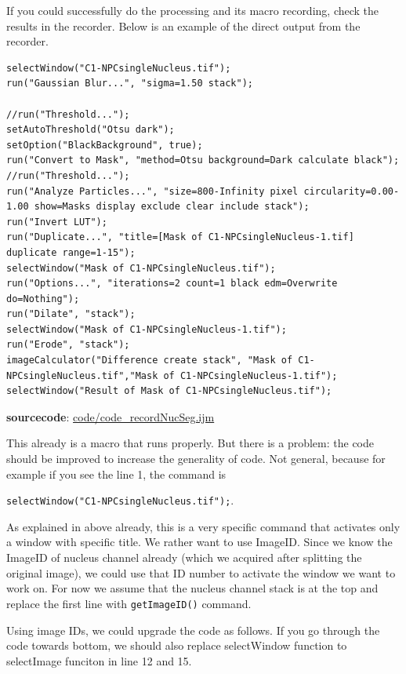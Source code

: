 \documentclass[11pt,a4paper,oneside]{report}
\newcommand{\ilcom}[1]{\texttt{\small#1}}
\begin{document}
If you could successfully do the processing and its macro recording, check the results in the recorder. Below is an example of the direct output from the recorder. 


\begin{lstlisting}
selectWindow("C1-NPCsingleNucleus.tif");
run("Gaussian Blur...", "sigma=1.50 stack");

//run("Threshold...");
setAutoThreshold("Otsu dark");
setOption("BlackBackground", true);
run("Convert to Mask", "method=Otsu background=Dark calculate black");
//run("Threshold...");
run("Analyze Particles...", "size=800-Infinity pixel circularity=0.00-1.00 show=Masks display exclude clear include stack");
run("Invert LUT");
run("Duplicate...", "title=[Mask of C1-NPCsingleNucleus-1.tif] duplicate range=1-15");
selectWindow("Mask of C1-NPCsingleNucleus.tif");
run("Options...", "iterations=2 count=1 black edm=Overwrite do=Nothing");
run("Dilate", "stack");
selectWindow("Mask of C1-NPCsingleNucleus-1.tif");
run("Erode", "stack");
imageCalculator("Difference create stack", "Mask of C1-NPCsingleNucleus.tif","Mask of C1-NPCsingleNucleus-1.tif");
selectWindow("Result of Mask of C1-NPCsingleNucleus.tif");

\end{lstlisting}
\textbf{sourcecode}: \href{http://www.example.com/contents}{code/code\_recordNucSeg.ijm}

This already is a macro that runs properly. But there is a problem: the code should be improved to increase the generality of code. Not general, because for example if you see the line 1, the command is 

\ilcom{selectWindow("C1-NPCsingleNucleus.tif");}. 


As explained in above already, this is a very specific command that activates only a window with specific title. We rather want to use ImageID. Since we know the ImageID of nucleus channel already (which we acquired after splitting the original image), we could use that ID number to activate the window we want to work on. For now we assume that the nucleus channel stack is at the top and replace the first line with \ilcom{getImageID()} command. 

Using image IDs, we could upgrade the code as follows.  If you go through the code towards bottom, we should also replace selectWindow function to selectImage funciton in line 12 and 15.
\end{document}

